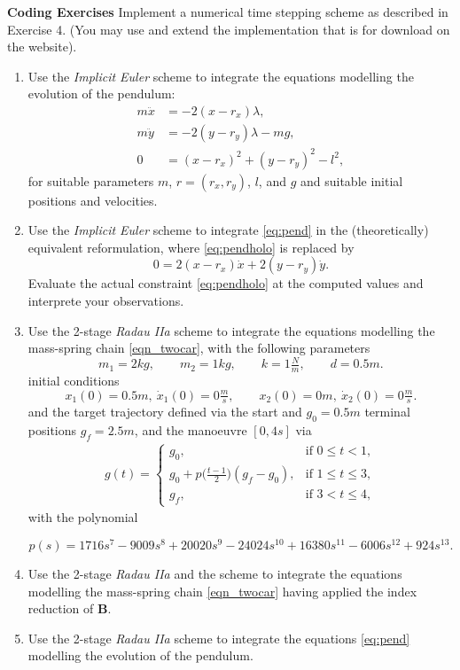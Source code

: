 \documentclass[a4paper,10pt]{article}
\begin{document}
\newpage
{\bf Coding Exercises}
Implement a numerical time stepping scheme as described in Exercise 4. (You may use and extend the implementation that is for download on the website).
\begin{enumerate}
	\item Use the \emph{Implicit Euler} scheme to integrate the equations modelling the evolution of the pendulum:
		\begin{subequations}\label{eq:pend}
			\begin{align}
				m\ddot x &= - 2(x-r_x)\lambda, \\
				m\ddot y &= - 2(y-r_y)\lambda - mg, \\
				0 &= (x-r_x)^{2} + (y-r_y)^2 - l^2, \label{eq:pendholo}
			\end{align}
		\end{subequations}
		for suitable parameters $m$, $r=(r_x, r_y)$, $l$, and $g$ and suitable initial positions and velocities.

	\item Use the \emph{Implicit Euler} scheme to integrate \eqref{eq:pend} in the (theoretically) equivalent reformulation, where \eqref{eq:pendholo} is replaced by 
		\begin{equation*}
			0 = 2(x-r_x)\dot x + 2(y-r_y)\dot y.
		\end{equation*}
		Evaluate the actual constraint \eqref{eq:pendholo} at the computed values and interprete your observations.
	\item Use the 2-stage \emph{Radau IIa} scheme to integrate the equations modelling the mass-spring chain \eqref{eqn_twocar}, with the following parameters
%
\[
  m_1 = 2 kg,\qquad 
  m_2 = 1 kg, \qquad
  k = 1 \tfrac Nm, \qquad 
  d = 0.5m.
\]
%
initial conditions
\[
  x_1(0) = 0.5 m,\ \dot x_1(0)  = 0 \tfrac ms, \qquad
x_2(0) = 0 m,\ \dot x_2(0) = 0 \tfrac ms.
\]
%
and the target trajectory defined via the start and $g_0 = 0.5m$ terminal positions $g_f = 2.5m$, and the manoeuvre $[0, 4s]$ via 
%
\begin{align*}
 g(t) = 
 \begin{cases}
	 g_0, 	& \text{if }0\leq t < 1, \\
	 g_0 + p\big(\frac{t-1}{2} \big) (g_f-g_0), 	& \text{if }1\leq t \leq 3, \\
	 g_f, 	& \text{if } 3 < t \leq 4,
 \end{cases}
\end{align*}
with the polynomial

%
\[
  p(s) = 1716 s^7 - 9009s^8 + 20020s^9 - 24024s^{10 }+ 16380s^{11 }- 6006s^{12 }+ 924s^{13}.
\]
%

	\item Use the 2-stage \emph{Radau IIa} and the scheme to integrate the equations modelling the mass-spring chain \eqref{eqn_twocar} having applied the index reduction of \textbf{B}.
	\item Use the 2-stage \emph{Radau IIa} scheme to integrate the equations \eqref{eq:pend} modelling the evolution of the pendulum. 
\end{enumerate}
\end{document}
